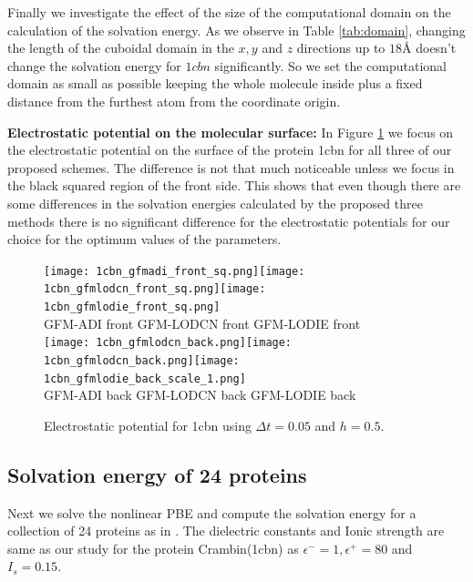 Finally we investigate the effect of the size of the computational domain on the calculation of the solvation energy. As we observe in Table \ref{tab:domain}, changing the length of the cuboidal domain in the $x,y$ and $z$ directions up to $18$\r{A} doesn't change the solvation energy for $1cbn$ significantly. So we set the computational domain as small as possible keeping the whole molecule inside plus a fixed distance from the furthest atom from the coordinate origin.   


{\bf Electrostatic potential on the molecular surface:} In Figure \ref{fig_1cbn} we focus on the electrostatic potential on the surface of the protein 1cbn for all three of our proposed schemes. The difference is not that much noticeable unless we focus in the black squared region of the front side. This shows that even though there are some differences in the solvation energies calculated by the proposed three methods there is no significant difference for the electrostatic potentials for our choice for the optimum values of the parameters.    

\begin{figure}[!ht]
\begin{center}	
	\texttt{[image: 1cbn\_gfmadi\_front\_sq.png]}\texttt{[image: 1cbn\_gfmlodcn\_front\_sq.png]}\texttt{[image: 1cbn\_gfmlodie\_front\_sq.png]}\\
GFM-ADI front \hskip 0.7in GFM-LODCN front \hskip 0.7in GFM-LODIE front\\
	\texttt{[image: 1cbn\_gfmlodcn\_back.png]}\texttt{[image: 1cbn\_gfmlodcn\_back.png]}\texttt{[image: 1cbn\_gfmlodie\_back\_scale\_1.png]}\\
  GFM-ADI back \hskip 0.7in GFM-LODCN back \hskip 0.7in GFM-LODIE back\\
	\caption{Electrostatic potential for 1cbn using $\Delta t = 0.05$ and $h= 0.5$. }
\label{fig_1cbn}
\end{center}
\end{figure}



\subsection{Solvation energy of 24 proteins}
Next we solve the nonlinear PBE and compute the solvation energy for a collection of 24 proteins as in \cite{Geng2007,Geng2017a}. The dielectric constants and Ionic strength are same as our study for the protein Crambin(1cbn) as $\epsilon^-=1, \epsilon^+=80$ and $I_s = 0.15$.
 


